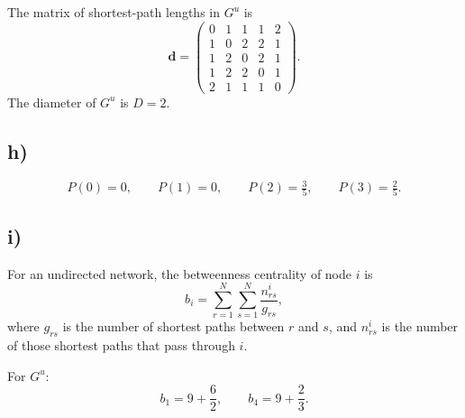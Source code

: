 \documentclass[11pt,a4paper]{article}
\begin{document}
The matrix of shortest-path lengths in $G^{u}$ is
\[
  \mathbf{d} =
  \begin{pmatrix}
    0 & 1 & 1 & 1 & 2 \\
    1 & 0 & 2 & 2 & 1 \\
    1 & 2 & 0 & 2 & 1 \\
    1 & 2 & 2 & 0 & 1 \\
    2 & 1 & 1 & 1 & 0
  \end{pmatrix}.
\]
The diameter of $G^{u}$ is $D = 2$.

\subsection*{h)}

\[
  P(0) = 0,\qquad P(1) = 0,\qquad P(2) = \tfrac{3}{5},\qquad P(3) = \tfrac{2}{5}.
\]

\subsection*{i)}

For an undirected network, the betweenness centrality of node $i$ is
\[
  b_i = \sum_{r=1}^{N} \sum_{s=1}^{N} \frac{n_{rs}^{i}}{g_{rs}},
\]
where $g_{rs}$ is the number of shortest paths between $r$ and $s$, and $n_{rs}^{i}$ is the number of those shortest paths that pass through $i$.

\medskip
\noindent
For $G^{u}$:
\[
  b_1 = 9 + \frac{6}{2},\qquad
  b_4 = 9 + \frac{2}{3}.
\]
\end{document}
